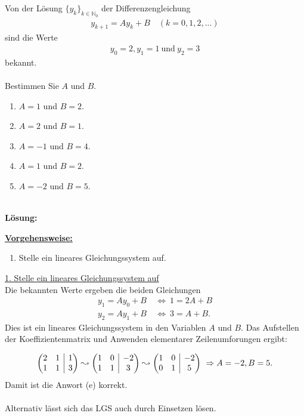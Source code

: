 \newpage

\subsection*{}
Von der Lösung $ \{y_k\}_{k \in \mathbb{N}_0} $ der Differenzengleichung
\begin{align*}
	y_{k+1} = A y_k + B \quad (k = 0,1,2,...)
\end{align*}
sind die Werte
\begin{align*}
	y_0 = 2, y_1 = 1 \ \textrm{und} \ y_2 = 3
\end{align*}
bekannt.\\
\\
Bestimmen Sie $ A $ und $ B $.
\renewcommand{\labelenumi}{(\alph{enumi})}
\begin{enumerate}
	\item
	$ A=1 $ und $ B=2 $.
	\item
	$ A=2 $ und $ B=1 $.	
	\item 
	$ A=-1 $ und $ B=4 $.
	\item
	$ A=1 $ und $ B=2 $.
	\item
	$ A=-2 $ und $ B=5 $.
\end{enumerate}
\ \\
\textbf{Lösung:}
\begin{mdframed}
\underline{\textbf{Vorgehensweise:}}
\renewcommand{\labelenumi}{\theenumi.}
\begin{enumerate}
\item Stelle ein lineares Gleichungssystem auf.
\end{enumerate}
\end{mdframed}

\underline{1. Stelle ein lineares Gleichungssystem auf}\\
Die bekannten Werte ergeben die beiden Gleichungen
\begin{align*}
	 y_1 = A y_0 + B 
	\ &\Leftrightarrow \
	1 = 2 A + B\\
	y_2 = A y_1 + B 
	\ &\Leftrightarrow \
	3 = A + B.
\end{align*}
Dies ist ein lineares Gleichungssystem in den Variablen $ A $ und $ B $. Das Aufstellen der Koeffizientenmatrix und Anwenden elementarer Zeilenumforungen ergibt:

\begin{align*}
	\begin{pmatrix}
		2 & 1 & \BAR & 1\\
		1 & 1 & \BAR & 3
	\end{pmatrix}
	\leadsto
	\begin{pmatrix}
		1 & 0 & \BAR & -2\\
		1 & 1 & \BAR & 3
	\end{pmatrix}
	\leadsto
	\begin{pmatrix}
		1 & 0 & \BAR & -2\\
		0 & 1 & \BAR & 5
	\end{pmatrix}
	\ \Rightarrow A = -2, B = 5.
\end{align*}
Damit ist die Anwort (e) korrekt.\\
\\
Alternativ lässt sich das LGS auch durch Einsetzen lösen.
\newpage

